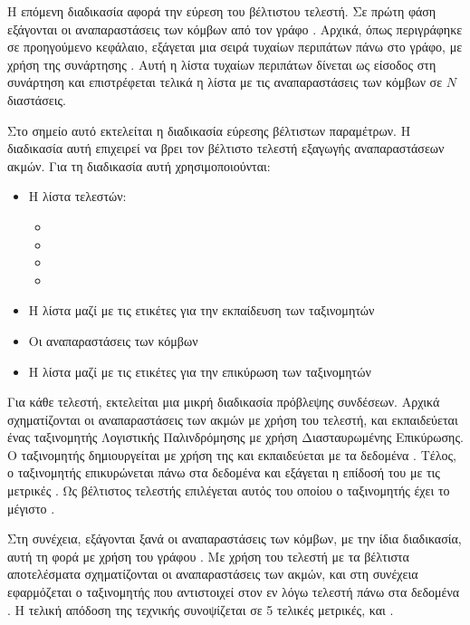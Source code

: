 Η επόμενη διαδικασία αφορά την εύρεση του βέλτιστου τελεστή. Σε πρώτη φάση εξάγονται οι
αναπαραστάσεις των κόμβων από τον γράφο . Αρχικά, όπως περιγράφηκε σε προηγούμενο
κεφάλαιο, εξάγεται μια σειρά τυχαίων περιπάτων πάνω στο γράφο, με χρήση της συνάρτησης
. Αυτή η λίστα τυχαίων περιπάτων δίνεται ως είσοδος
στη συνάρτηση  και επιστρέφεται τελικά η λίστα με τις αναπαραστάσεις
των κόμβων σε \(N\) διαστάσεις.

Στο σημείο αυτό εκτελείται η διαδικασία εύρεσης βέλτιστων παραμέτρων. Η διαδικασία αυτή επιχειρεί
να βρει τον βέλτιστο τελεστή εξαγωγής αναπαραστάσεων ακμών. Για τη διαδικασία αυτή 
χρησιμοποιούνται:

\begin{itemize}
    \item Η λίστα τελεστών: \begin{itemize}
        \item {}
        \item {}
        \item {}
        \item {}
    \end{itemize}
    \item Η λίστα  μαζί με τις ετικέτες  για την εκπαίδευση
    των ταξινομητών
    \item Οι αναπαραστάσεις των κόμβων
    \item Η λίστα  μαζί με τις ετικέτες
     για την επικύρωση των ταξινομητών
\end{itemize}

Για κάθε τελεστή, εκτελείται μια μικρή διαδικασία πρόβλεψης συνδέσεων. Αρχικά σχηματίζονται 
οι αναπαραστάσεις των ακμών με χρήση του τελεστή, και εκπαιδεύεται ένας ταξινομητής 
Λογιστικής Παλινδρόμησης με χρήση Διασταυρωμένης Επικύρωσης. Ο ταξινομητής δημιουργείται με 
χρήση της  και εκπαιδεύεται με τα δεδομένα
. Τέλος, ο ταξινομητής επικυρώνεται πάνω στα δεδομένα
 και εξάγεται η επίδοσή του 
με τις μετρικές . Ως βέλτιστος τελεστής επιλέγεται 
αυτός του οποίου ο ταξινομητής έχει το μέγιστο .

Στη συνέχεια, εξάγονται ξανά οι αναπαραστάσεις των κόμβων, με την ίδια διαδικασία, αυτή τη φορά
με χρήση του γράφου . Με χρήση του τελεστή με τα βέλτιστα αποτελέσματα σχηματίζονται
οι αναπαραστάσεις των ακμών, και στη συνέχεια εφαρμόζεται ο ταξινομητής που αντιστοιχεί στον 
εν λόγω τελεστή πάνω στα δεδομένα . Η τελική απόδοση της 
τεχνικής συνοψίζεται σε 5 τελικές μετρικές,  και .


